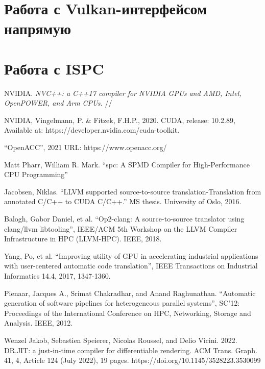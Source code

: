 \documentclass[11pt,fleqn,english,russian]{report} %
\begin{document}
\chapter{Работа с Vulkan-интерфейсом напрямую}\label{vulkan-direct}

\chapter{Работа с ISPC}


\begin{thebibliography}{10}
	
	 NVIDIA. \textit{NVC++: a C++17 compiler for NVIDIA GPUs and AMD, Intel, OpenPOWER, and Arm CPUs.} // 	
	
	 NVIDIA, Vingelmann, P. \& Fitzek, F.H.P., 2020. CUDA, release: 10.2.89, Available at: https://developer.nvidia.com/cuda-toolkit.	
	
	 ``OpenACC'', 2021 URL: https://www.openacc.org/
	
	 Matt Pharr, William R. Mark. ``spc: A SPMD Compiler for High-Performance CPU Programming''
	
	 Jacobsen, Niklas. ``LLVM supported source-to-source translation-Translation from annotated C/C++ to CUDA C/C++.'' MS thesis. University of Oslo, 2016. 
	
	 Balogh, Gabor Daniel, et al. ``Op2-clang: A source-to-source translator using clang/llvm libtooling'', IEEE/ACM 5th Workshop on the LLVM Compiler Infrastructure in HPC (LLVM-HPC). IEEE, 2018. 
	
	 Yang, Po, et al. ``Improving utility of GPU in accelerating industrial applications with user-centered automatic code translation'', IEEE Transactions on Industrial Informatics 14.4, 2017, 1347-1360. 
	
	 Pienaar, Jacques A., Srimat Chakradhar, and Anand Raghunathan. ``Automatic generation of software pipelines for heterogeneous parallel systems'', SC'12: Proceedings of the International Conference on HPC, Networking, Storage and Analysis. IEEE, 2012. 	
	
	 Wenzel Jakob, Sebastien Speierer, Nicolas Roussel, and Delio Vicini. 2022. DR.JIT: a just-in-time compiler for differentiable rendering. ACM Trans. Graph. 41, 4, Article 124 (July 2022), 19 pages. https://doi.org/10.1145/3528223.3530099
	

\end{thebibliography}
\end{document}
